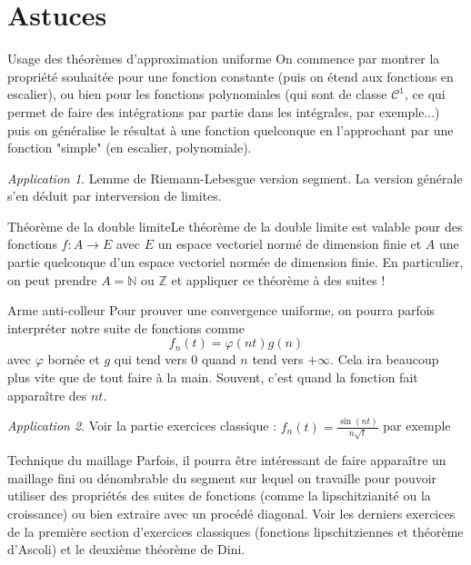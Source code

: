 \documentclass[french]{book}
\newcommand{\N}{\mathbb{N}}
\newcommand{\Z}{\mathbb{Z}}
\theoremstyle{plain}
\theoremstyle{definition}
\theoremstyle{remark}
\newtheorem*{app}{Application}
\begin{document}
\section{Astuces}
\begin{AS}{Usage des théorèmes d’approximation uniforme } On commence par montrer la propriété souhaitée pour une fonction constante (puis on étend aux fonctions en escalier), ou bien pour les fonctions polynomiales (qui sont de classe $\mathcal{C}^1$, ce qui permet de faire des intégrations par partie dans les intégrales, par exemple...) puis on généralise le résultat à une fonction quelconque en l’approchant par une fonction "simple" (en escalier, polynomiale).
\end{AS}
\begin{app}
	Lemme de Riemann-Lebesgue version segment. La version générale s'en déduit par interversion de limites.
\end{app}
\begin{AS}{Théorème de la double limite}Le théorème de la double limite est valable pour des fonctions $f:A\to E$ avec $E$ un espace vectoriel normé de dimension finie et $A$ une partie quelconque d’un espace vectoriel normée de dimension finie. En particulier, on peut prendre $A = \N$ ou $\Z$ et appliquer ce théorème à des suites !
\end{AS}
\begin{AS}{Arme anti-colleur} Pour prouver une convergence uniforme, on pourra parfois interpréter notre suite de fonctions comme $$f_n(t)=\varphi(nt)g(n)$$ avec $\varphi$ bornée et $g$ qui tend vers $0$ quand $n$ tend vers $+\infty$. Cela ira beaucoup plus vite que de tout faire à la main. Souvent, c'est quand la fonction fait apparaître des $nt$.
\end{AS}
\begin{app}
	Voir la partie exercices classique : $\displaystyle f_n(t)=\frac{\sin(nt)}{n\sqrt{t}}$ par exemple
\end{app}
\begin{AS}{Technique du maillage} Parfois, il pourra être intéressant de faire apparaître un maillage fini ou dénombrable du segment sur lequel on travaille pour pouvoir utiliser des propriétés des suites de fonctions (comme la lipschitzianité ou la croissance) ou bien extraire avec un procédé diagonal. Voir les derniers exercices de la première section d'exercices classiques (fonctions lipschitziennes et théorème d'Ascoli) et le deuxième théorème de Dini.
\end{AS}
\end{document}

